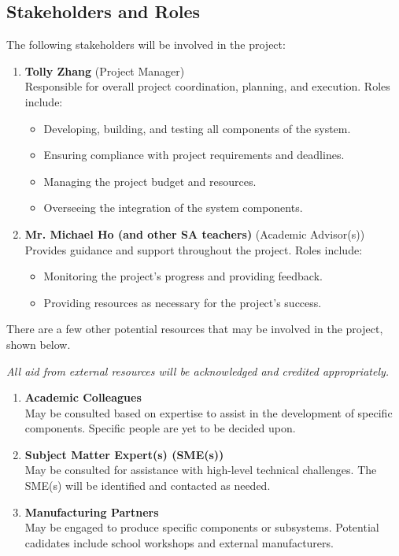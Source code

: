 \documentclass[12pt]{article}
\begin{document}
\subsection{Stakeholders and Roles}
The following stakeholders will be involved in the project:
\begin{enumerate}
    \item \textbf{Tolly Zhang} (Project Manager) \\
    Responsible for overall project coordination, planning, and execution. Roles include:
    \begin{itemize}
        \item Developing, building, and testing all components of the system.
        \item Ensuring compliance with project requirements and deadlines.
        \item Managing the project budget and resources.
        \item Overseeing the integration of the system components.
    \end{itemize}
    \item \textbf{Mr. Michael Ho (and other SA teachers)} (Academic Advisor(s)) \\
    Provides guidance and support throughout the project. Roles include:
    \begin{itemize}
        \item Monitoring the project's progress and providing feedback.
        \item Providing resources as necessary for the project's success.
    \end{itemize}
\end{enumerate}
There are a few other potential resources that may be involved in the project, shown below.

\textit{All aid from external resources will be acknowledged and credited appropriately.}
\begin{enumerate}
    \item \textbf{Academic Colleagues} \\
    May be consulted based on expertise to assist in the development of specific components. Specific people are yet to be decided upon.
    \item \textbf{Subject Matter Expert(s) (SME(s))} \\
    May be consulted for assistance with high-level technical challenges. The SME(s) will be identified and contacted as needed.
    \item \textbf{Manufacturing Partners} \\
    May be engaged to produce specific components or subsystems. Potential cadidates include school workshops and external manufacturers.
\end{enumerate}
\end{document}
